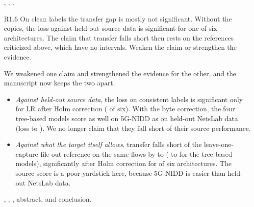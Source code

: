 \action {}, , .

\label{rv:R1.6}
\begin{concern}{R1.6}
On clean labels the transfer gap is mostly not significant. Without the copies, the loss against held-out source data is significant for one of six architectures. The claim that transfer falls short then rests on the references criticized above, which have no intervals. Weaken the claim or strengthen the evidence.
\end{concern}
\response We weakened one claim and strengthened the evidence for the other, and the manuscript now keeps the two apart.
\begin{itemize}[leftmargin=*, itemsep=1pt]
\item \emph{Against held-out source data}, the loss on consistent labels is significant only for LR after Holm correction (\RTrCleanSigNbN{} of six). With the byte correction, the four tree-based models score as well on 5G-NIDD as on held-out NetsLab data (loss \RTrTreeCleanDmin{} to \RTrTreeCleanDmax). We no longer claim that they fall short of their source performance.
\item \emph{Against what the target itself allows}, transfer falls short of the leave-one-capture-file-out reference on the same flows by \RGapCleanMin{} to \RGapCleanMax{} (\RGapTreeCleanMin{} to \RGapTreeCleanMax{} for the tree-based models), significantly after Holm correction for \RGapCleanSigN{} of six architectures. The source score is a poor yardstick here, because 5G-NIDD is easier than held-out NetsLab data.
\end{itemize}

\action {}, , , abstract, and conclusion.

